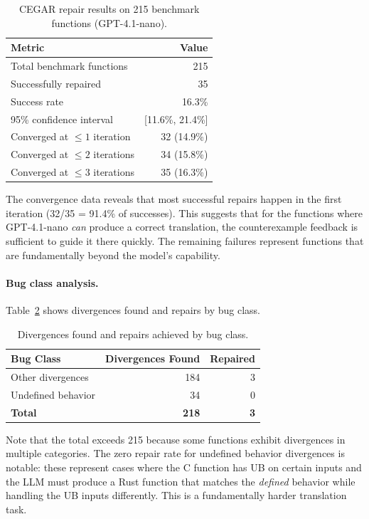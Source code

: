 \documentclass[10pt,letterpaper]{article}
\begin{document}
\begin{table}[t]
\centering
\caption{CEGAR repair results on 215 benchmark functions (GPT-4.1-nano).}
\label{tab:cegar_full}
\begin{tabular}{@{}lr@{}}
\toprule
\textbf{Metric} & \textbf{Value} \\
\midrule
Total benchmark functions & 215 \\
Successfully repaired & 35 \\
Success rate & 16.3\% \\
95\% confidence interval & [11.6\%, 21.4\%] \\
\midrule
Converged at $\leq 1$ iteration & 32 (14.9\%) \\
Converged at $\leq 2$ iterations & 34 (15.8\%) \\
Converged at $\leq 3$ iterations & 35 (16.3\%) \\
\bottomrule
\end{tabular}
\end{table}

The convergence data reveals that most successful repairs happen in the first
iteration (32/35 = 91.4\% of successes). This suggests that for the functions
where GPT-4.1-nano \emph{can} produce a correct translation, the counterexample
feedback is sufficient to guide it there quickly. The remaining failures represent
functions that are fundamentally beyond the model's capability.

\paragraph{Bug class analysis.}
Table~\ref{tab:bugclass} shows divergences found and repairs by bug class.

\begin{table}[t]
\centering
\caption{Divergences found and repairs achieved by bug class.}
\label{tab:bugclass}
\begin{tabular}{@{}lrr@{}}
\toprule
\textbf{Bug Class} & \textbf{Divergences Found} & \textbf{Repaired} \\
\midrule
Other divergences & 184 & 3 \\
Undefined behavior & 34 & 0 \\
\midrule
\textbf{Total} & \textbf{218} & \textbf{3} \\
\bottomrule
\end{tabular}
\end{table}

Note that the total exceeds 215 because some functions exhibit divergences in
multiple categories. The zero repair rate for undefined behavior divergences is
notable: these represent cases where the C function has UB on certain inputs and
the LLM must produce a Rust function that matches the \emph{defined} behavior
while handling the UB inputs differently. This is a fundamentally harder
translation task.
\end{document}
